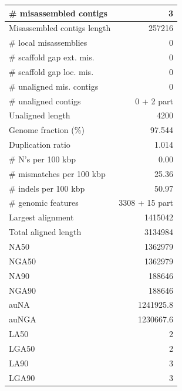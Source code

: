 \documentclass[12pt,a4paper]{article}
\begin{document}
\begin{table}[ht]
\begin{center}
\begin{tabular}{|l*{1}{|r}|}
\# misassembled contigs & 3 \\ \hline
Misassembled contigs length & 257216 \\ \hline
\# local misassemblies & 0 \\ \hline
\# scaffold gap ext. mis. & 0 \\ \hline
\# scaffold gap loc. mis. & 0 \\ \hline
\# unaligned mis. contigs & 0 \\ \hline
\# unaligned contigs & 0 + 2 part \\ \hline
Unaligned length & 4200 \\ \hline
Genome fraction (\%) & 97.544 \\ \hline
Duplication ratio & 1.014 \\ \hline
\# N's per 100 kbp & 0.00 \\ \hline
\# mismatches per 100 kbp & 25.36 \\ \hline
\# indels per 100 kbp & 50.97 \\ \hline
\# genomic features & 3308 + 15 part \\ \hline
Largest alignment & 1415042 \\ \hline
Total aligned length & 3134984 \\ \hline
NA50 & 1362979 \\ \hline
NGA50 & 1362979 \\ \hline
NA90 & 188646 \\ \hline
NGA90 & 188646 \\ \hline
auNA & 1241925.8 \\ \hline
auNGA & 1230667.6 \\ \hline
LA50 & 2 \\ \hline
LGA50 & 2 \\ \hline
LA90 & 3 \\ \hline
LGA90 & 3 \\ \hline
\end{tabular}
\end{center}
\end{table}
\end{document}
